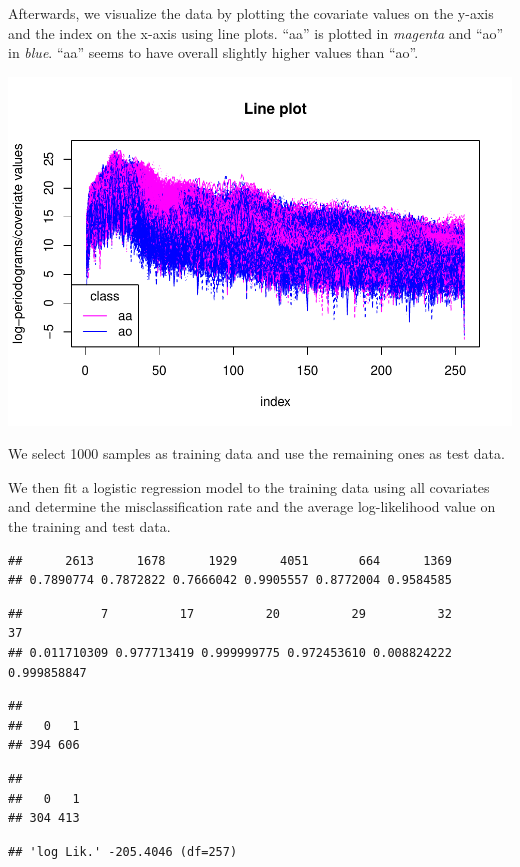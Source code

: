 \documentclass[
]{article}
\begin{document}
Afterwards, we visualize the data by plotting the covariate values on
the y-axis and the index on the x-axis using line plots. ``aa'' is
plotted in \textit{magenta} and ``ao'' in \textit{blue}. ``aa'' seems to
have overall slightly higher values than ``ao''.

\includegraphics{A2_files/figure-latex/unnamed-chunk-19-1.pdf}

We select 1000 samples as training data and use the remaining ones as
test data.

We then fit a logistic regression model to the training data using all
covariates and determine the misclassification rate and the average
log-likelihood value on the training and test data.

\begin{verbatim}
##      2613      1678      1929      4051       664      1369 
## 0.7890774 0.7872822 0.7666042 0.9905557 0.8772004 0.9584585
\end{verbatim}

\begin{verbatim}
##           7          17          20          29          32          37 
## 0.011710309 0.977713419 0.999999775 0.972453610 0.008824222 0.999858847
\end{verbatim}

\begin{verbatim}
## 
##   0   1 
## 394 606
\end{verbatim}

\begin{verbatim}
## 
##   0   1 
## 304 413
\end{verbatim}

\begin{verbatim}
## 'log Lik.' -205.4046 (df=257)
\end{verbatim}
\end{document}
